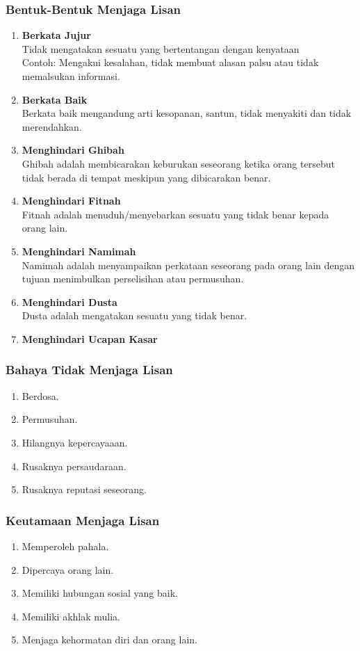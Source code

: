 \subsubsection{Bentuk-Bentuk Menjaga Lisan}
\begin{enumerate}
\item \textbf{Berkata Jujur} \\
  Tidak mengatakan sesuatu yang bertentangan dengan kenyataan \\
  Contoh: Mengakui kesalahan, tidak membuat alasan palsu atau tidak memalsukan informasi.
\item \textbf{Berkata Baik} \\
  Berkata baik mengandung arti kesopanan, santun, tidak menyakiti dan tidak merendahkan.
\item \textbf{Menghindari Ghibah} \\
  Ghibah adalah membicarakan keburukan seseorang ketika orang tersebut tidak berada di tempat meskipun yang dibicarakan benar.
\item \textbf{Menghindari Fitnah} \\
  Fitnah adalah menuduh/menyebarkan sesuatu yang tidak benar kepada orang lain.
\item \textbf{Menghindari Namimah} \\
  Namimah adalah menyampaikan perkataan seseorang pada orang lain dengan tujuan menimbulkan perselisihan atau permusuhan.
\item \textbf{Menghindari Dusta} \\
  Dusta adalah mengatakan sesuatu yang tidak benar.
\item \textbf{Menghindari Ucapan Kasar} \\
\end{enumerate}

\subsubsection{Bahaya Tidak Menjaga Lisan}
\begin{enumerate}
\item Berdosa.
\item Permusuhan.
\item Hilangnya kepercayaaan.
\item Rusaknya persaudaraan.
\item Rusaknya reputasi seseorang.
\end{enumerate}

\subsubsection{Keutamaan Menjaga Lisan}
\begin{enumerate}
\item Memperoleh pahala.
\item Dipercaya orang lain.
\item Memiliki hubungan sosial yang baik.
\item Memiliki akhlak mulia.
\item Menjaga kehormatan diri dan orang lain.
\end{enumerate}

